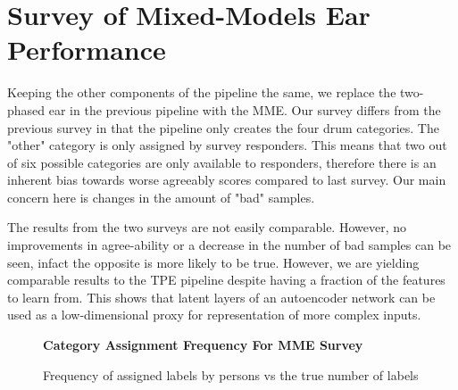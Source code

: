 \documentclass[\main/thesis.tex]{subfiles}
\begin{document}
 \section{Survey of Mixed-Models Ear Performance}
 Keeping the other components of the pipeline the same, we replace the two-phased ear in the previous pipeline with the MME. Our survey differs from the previous survey in that the pipeline only creates the four drum categories. The "other" category is only assigned by survey responders. This means that two out of six possible categories are only available to responders, therefore there is an inherent bias towards worse agreeably scores compared to last survey. Our main concern here is changes in the amount of "bad" samples. 
 
The results from the two surveys are not easily comparable. However, no improvements in agree-ability or a decrease in the number of bad samples can be seen, infact the opposite is more likely to be true. However, we are yielding comparable results to the TPE pipeline despite having a fraction of the features to learn from. This shows that latent layers of an autoencoder network can be used as a low-dimensional proxy for representation of more complex inputs. 
 \begin{table}[t]
\caption{\label{kappa_table}Table of Fleiss' kappa coefficient to measure the degree of agreement between persons (HvH) and persons and MME. We also measure the agreeability scores after dropping bad samples if both or either persons assigned the sample as such. }
\end{table}
\label{survey:2p}
\begin{figure}[htpb]
    \begin{center}
    \textbf{Category Assignment Frequency For MME Survey}
    \end{center}
    \caption{Frequency of assigned labels by persons vs the true number of labels}
\label{fig:freq-survey-2p}
\end{figure}
\end{document}
